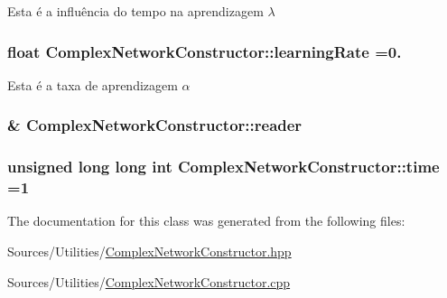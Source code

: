 Esta é a influência do tempo na aprendizagem $ \lambda $ \hypertarget{class_complex_network_constructor_aa7fe374b9733338b8176708f77d29c55}{
\subsubsection[{learning\+Rate}]{\setlength{\rightskip}{0pt plus 5cm}float Complex\+Network\+Constructor\+::learning\+Rate =0.\hspace{0.3cm}{\ttfamily [private]}}}\label{class_complex_network_constructor_aa7fe374b9733338b8176708f77d29c55}
Esta é a taxa de aprendizagem $ \alpha $ \hypertarget{class_complex_network_constructor_ad223ad7e464ff159d91a89deb4e943cc}{
\subsubsection[{reader}]{\& Complex\+Network\+Constructor\+::reader\hspace{0.3cm}{\ttfamily [private]}}}\label{class_complex_network_constructor_ad223ad7e464ff159d91a89deb4e943cc}
\hypertarget{class_complex_network_constructor_afc016404ca7dda4b05807e3ca004c308}{
\subsubsection[{time}]{\setlength{\rightskip}{0pt plus 5cm}unsigned long long int Complex\+Network\+Constructor\+::time =1\hspace{0.3cm}{\ttfamily [private]}}}\label{class_complex_network_constructor_afc016404ca7dda4b05807e3ca004c308}


The documentation for this class was generated from the following files\+:\begin{DoxyCompactItemize}
\item 
Sources/\+Utilities/\hyperlink{_complex_network_constructor_8hpp}{Complex\+Network\+Constructor.\+hpp}\item 
Sources/\+Utilities/\hyperlink{_complex_network_constructor_8cpp}{Complex\+Network\+Constructor.\+cpp}\end{DoxyCompactItemize}
